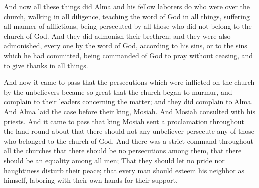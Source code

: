And now all these things did Alma and his fellow laborers do who were over the church, walking in all diligence, teaching the word of God in all things, suffering all manner of afflictions, being persecuted by all those who did not belong to the church of God.
\bverse \iffalse And they did admonish their brethren; and they were also admonished, every one by the word of God, according to his sins, or to the sins which he had committed, being commanded of God to pray without ceasing, and to give thanks in all things. \fi
And they did admonish their brethren; and they were also admonished, every one by the word of God, according to his sins, or to the sins which he had committed, being commanded of God to pray without ceasing, and to give thanks in all things.

\bchapter
\bverse \iffalse And now it came to pass that the persecutions which were inflicted on the church by the unbelievers became so great that the church began to murmur, and complain to their leaders concerning the matter; and they did complain to Alma. And Alma laid the case before their king, Mosiah. And Mosiah consulted with his priests. \fi
And now it came to pass that the persecutions which were inflicted on the church by the unbelievers became so great that the church began to murmur, and complain to their leaders concerning the matter; and they did complain to Alma. And Alma laid the case before their king, Mosiah. And Mosiah consulted with his priests.
\bverse \iffalse And it came to pass that king Mosiah sent a proclamation throughout the land round about that there should not any unbeliever persecute any of those who belonged to the church of God. \fi
And it came to pass that king Mosiah sent a proclamation throughout the land round about that there should not any unbeliever persecute any of those who belonged to the church of God.
\bverse \iffalse And there was a strict command throughout all the churches that there should be no persecutions among them, that there should be an equality among all men; \fi
And there was a strict command throughout all the churches that there should be no persecutions among them, that there should be an equality among all men;
\bverse \iffalse That they should let no pride nor haughtiness disturb their peace; that every man should esteem his neighbor as himself, laboring with their own hands for their support. \fi
That they should let no pride nor haughtiness disturb their peace; that every man should esteem his neighbor as himself, laboring with their own hands for their support.
